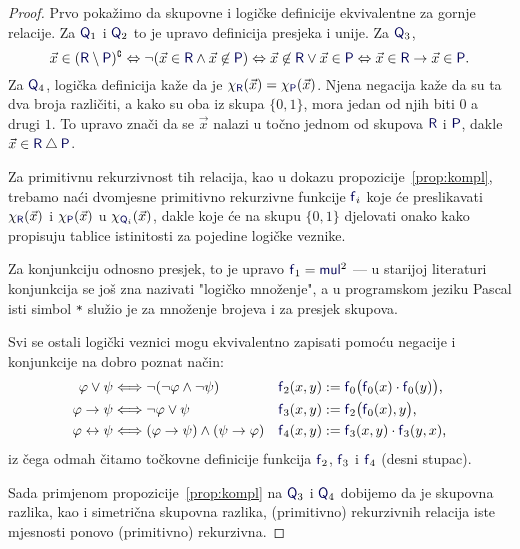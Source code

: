 \begin{proof}
Prvo pokažimo da skupovne i logičke definicije ekvivalentne za gornje relacije. Za $\f Q_1$ i $\f Q_2$ to je upravo definicija presjeka i unije. Za $\f Q_3$, \begin{equation}
    \vec x\in(\f R\setminus\f P)\kompl\Leftrightarrow\lnot(\vec x\in\f R\land\vec x\not\in\f P)\Leftrightarrow\vec x\not\in\f R\lor\vec x\in\f P\Leftrightarrow\vec x\in \f R\to\vec x\in\f P\text.
\end{equation}
Za $\f Q_4$, logička definicija kaže da je $\chi_{\f R}(\vec x)=\chi_{\f P}(\vec x)$. Njena negacija kaže da su ta dva broja različiti, a kako su oba iz skupa $\{0,1\}$, mora jedan od njih biti $0$ a drugi $1$. To upravo znači da se $\vec x$ nalazi u točno jednom od skupova $\f R$ i $\f P$, dakle $\vec x\in\f R\mathbin\triangle\f P$.

Za primitivnu rekurzivnost tih relacija, kao u dokazu propozicije~\ref{prop:kompl}, trebamo naći dvomjesne primitivno rekurzivne funkcije $\f f_i$ koje će preslikavati $\chi_{\f R}(\vec x)$ i $\chi_{\f P}(\vec x)$ u $\chi_{\f Q_i}(\vec x)$, dakle koje će na skupu $\{0,1\}$ djelovati onako kako propisuju tablice istinitosti za pojedine logičke veznike.

Za konjunkciju odnosno presjek, to je upravo $\f f_1=\f{mul}^2$ --- u starijoj literaturi konjunkcija se još zna nazivati "logičko množenje", a u programskom jeziku Pascal isti simbol \texttt{*} služio je za množenje brojeva i za presjek skupova.

Svi se ostali logički veznici mogu ekvivalentno zapisati pomoću negacije i konjunkcije na dobro poznat način:
\begin{align}
    \varphi\lor\psi&\Longleftrightarrow\lnot(\lnot\varphi\land\lnot\psi)
    &
    \f f_2(x,y)&:=
    \f f_0\bigl(
      \f f_0(x)\cdot\f f_0(y)
    \bigr)\text,
    \\
    \varphi\to\psi&\Longleftrightarrow\lnot\varphi\lor\psi
    &
    \f f_3(x,y)&:=\f f_2\bigl(\f f_0(x),y\bigr)\text,
    \\
    \varphi\leftrightarrow\psi&\Longleftrightarrow(\varphi\to\psi)\land(\psi\to\varphi)
    &
    \f f_4(x,y)&:=\f f_3(x,y)\cdot\f f_3(y,x)\text,
\end{align}
iz čega odmah čitamo točkovne definicije funkcija $\f f_2$, $\f f_3$ i $\f f_4$ (desni stupac).

Sada primjenom propozicije~\ref{prop:kompl} na $\f Q_3$ i $\f Q_4$ dobijemo da je skupovna razlika, kao i simetrična skupovna razlika, (primitivno) rekurzivnih relacija iste mjesnosti ponovo (primitivno) rekurzivna.
\end{proof}

